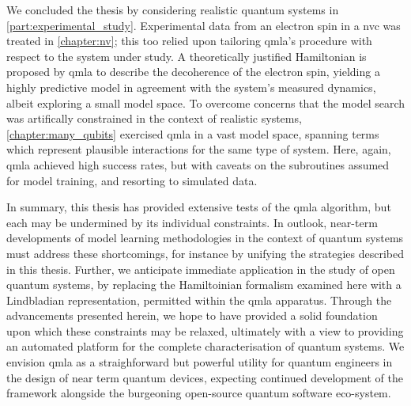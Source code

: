 \par 

We concluded the thesis by considering realistic quantum systems in \cref{part:experimental_study}. 
Experimental data from an electron spin in a \gls{nvc} was treated in \cref{chapter:nv};
    this too relied upon tailoring \gls{qmla}'s procedure with respect to the system under study.
A theoretically justified Hamiltonian is proposed by \gls{qmla} to describe the decoherence of the electron spin, 
    yielding a highly predictive model in agreement with the system's measured dynamics, 
    albeit exploring a small model space. 
To overcome concerns that the model search was artifically constrained in the context of realistic systems, 
    \cref{chapter:many_qubits} exercised \gls{qmla} in a vast model space, 
    spanning terms which represent plausible interactions for the same type of system. 
Here, again, \gls{qmla} achieved high success rates, but with caveats on the subroutines assumed for model training, 
    and resorting to simulated data. 
\par

In summary, this thesis has provided extensive tests of the \gls{qmla} algorithm, 
    but each may be undermined by its individual constraints. 
In outlook, near-term developments of model learning methodologies in the context of quantum systems
    must address these shortcomings, for instance by unifying the strategies described in this thesis. 
Further, we anticipate immediate application in the study of open quantum systems, 
    by replacing the Hamiltoinian formalism examined here with a Lindbladian representation, 
    permitted within the \gls{qmla} apparatus.    
Through the advancements presented herein, we hope to have provided a solid foundation upon which these constraints may be relaxed, 
    ultimately with a view to providing an automated platform for the complete characterisation of quantum systems.
We envision \gls{qmla} as a straighforward but powerful utility for quantum engineers in the design of near term quantum devices, 
    expecting continued development of the framework alongside the burgeoning open-source quantum software eco-system. 
\par


